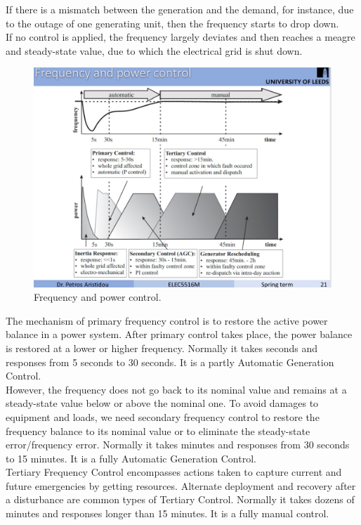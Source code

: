 \documentclass{report}
\begin{document}
If there is a mismatch between the generation and the demand, for instance, due to the outage of one generating unit, then the frequency starts to drop down. \\

If no control is applied, the frequency largely deviates and then reaches a meagre and steady-state value, due to which the electrical grid is shut down.\\

\begin{figure}[htbp]
\centering
\includegraphics[width = .819\textwidth]{figure/2_1_freq.jpeg}
\caption{Frequency and power control.}
\label{2_1_freq}
\end{figure}

The mechanism of primary frequency control is to restore the active power balance in a power system. After primary control takes place, the power balance is restored at a lower or higher frequency. Normally it takes seconds and responses from 5 seconds to 30 seconds. It is a partly Automatic Generation Control.\\


However, the frequency does not go back to its nominal value and remains at a steady-state value below or above the nominal one. To avoid damages to equipment and loads, we need secondary frequency control to restore the frequency balance to its nominal value or to eliminate the steady-state error/frequency error. Normally it takes minutes and responses from 30 seconds to 15 minutes. It is a fully Automatic Generation Control.\\


Tertiary Frequency Control encompasses actions taken to capture current and future emergencies by getting resources. Alternate deployment and recovery after a disturbance are common types of Tertiary Control. Normally it takes dozens of minutes and responses longer than 15 minutes. It is a fully manual control.
\end{document}
